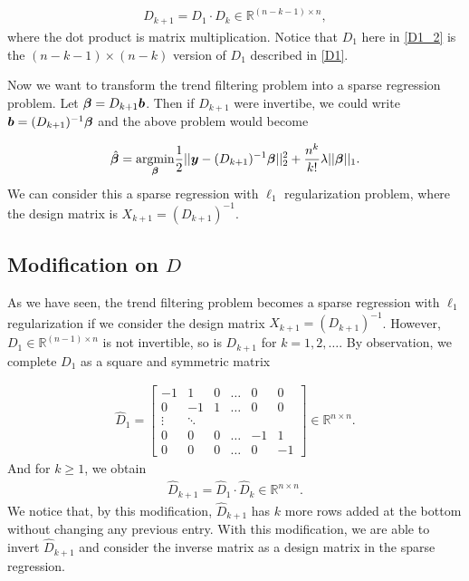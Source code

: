 \begin{align}\label{D1_2}
D_{k+1} = D_{1} \cdot D_{k} \in \mathbb{R}^{(n-k-1)\times n},
\end{align}
where the dot product is matrix multiplication. Notice that $D_1$ here in \ref{D1_2} is the $(n-k-1)\times (n-k)$ version of $D_1$ described in \ref{D1}.

Now we want to transform the trend filtering problem into a sparse regression problem. Let $\bm{\beta}=D_{k+1}\bm b$. Then if $D_{k+1}$ were invertibe, we could write $\bm b = (D_{k+1})^{-1}\bm{\beta}$ and the above problem would become

\begin{align}
\hat{\bm{\beta}} = \underset{\bm{\beta}}{\mathrm{argmin}} \frac{1}{2}||\bm y- (D_{k+1})^{-1}\bm{\beta}||_2^2 + \frac{n^k}{k!}\lambda||\bm{\beta}||_1.
\end{align}
We can consider this a sparse regression with $\ell_1$ regularization problem, where the design matrix is $X_{k+1} = (D_{k+1})^{-1}$. 

\subsection{Modification on $D$}
As we have seen, the trend filtering problem becomes a sparse regression with $\ell_1$ regularization if we consider the design matrix  $X_{k+1} = (D_{k+1})^{-1}$. However, $D_{1} \in \mathbb{R}^{(n-1)\times n}$ is not invertible, so is $D_{k+1}$ for $k=1,2,\dots$. By observation, we complete $D_{1}$ as a square and symmetric matrix  

\begin{align}
\hat{D}_{1} = \begin{bmatrix} 
    -1 & 1 & 0 & \dots & 0 & 0\\
    0 & -1 & 1 & \dots & 0 & 0\\
    \vdots & \ddots & \\
    0 & 0 & 0 & \dots & -1 & 1\\
    0 & 0 & 0 & \dots & 0 & -1
    \end{bmatrix}
    \in \mathbb{R}^{n\times n}.
\end{align}
And for $k\geq 1$, we obtain
\begin{align}
\hat{D}_{k+1} = \hat{D}_{1} \cdot \hat{D}_{k} \in \mathbb{R}^{n\times n}.
\end{align}
We notice that, by this modification, $\hat{D}_{k+1}$ has $k$ more rows added at the bottom without changing any previous entry. With this modification, we are able to invert $\hat{D}_{k+1}$ and consider the inverse matrix as a design matrix in the sparse regression. 

